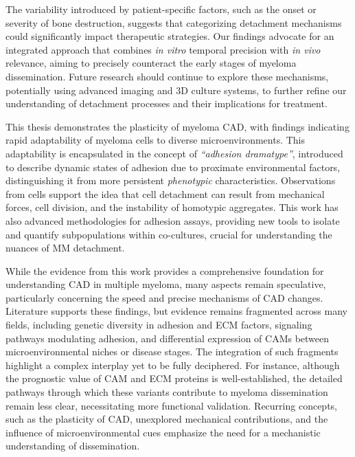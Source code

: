 The variability introduced by patient-specific factors, such as the onset or
severity of bone destruction, suggests that categorizing detachment mechanisms
could significantly impact therapeutic strategies. Our findings advocate for an
integrated approach that combines \textit{in vitro} temporal precision with
\textit{in vivo} relevance, aiming to precisely counteract the early stages of
myeloma dissemination. Future research should continue to explore these
mechanisms, potentially using advanced imaging and 3D culture systems, to
further refine our understanding of detachment processes and their implications
for treatment.


%
\label{sec:discussion:conclusioncancer}%

This thesis demonstrates the plasticity of myeloma
\acf{CAD}, with findings indicating rapid adaptability of
myeloma cells to diverse microenvironments. This adaptability is encapsulated in
the concept of \emph{“adhesion dramatype”}, introduced to
describe dynamic states of adhesion due to proximate environmental factors,
distinguishing it from more persistent \emph{phenotypic} characteristics.
Observations from \INA cells support the idea that cell detachment can result
from mechanical forces, cell division, and the instability of homotypic
aggregates.
This work has also advanced methodologies for adhesion
assays, providing new tools to isolate and quantify subpopulations within
co-cultures, crucial for understanding the nuances of MM detachment.

While the evidence from this work provides a comprehensive foundation for
understanding \ac{CAD} in multiple myeloma, many aspects remain speculative,
particularly concerning the speed and precise mechanisms of \ac{CAD} changes.
Literature supports these findings, but evidence remains fragmented across many
fields, including genetic diversity in adhesion and \ac{ECM} factors, signaling
pathways modulating adhesion, and differential expression of \acp{CAM} between
microenvironmental niches or disease stages. The integration of such fragments
highlight a complex interplay yet to be fully deciphered. For instance, although
the prognostic value of \ac{CAM} and \ac{ECM} proteins is well-established, the
detailed pathways through which these variants contribute to myeloma
dissemination remain less clear, necessitating more functional validation.
Recurring concepts, such as the plasticity of \ac{CAD}, unexplored mechanical
contributions, and the influence of microenvironmental cues emphasize 
the need for a mechanistic understanding of dissemination.

